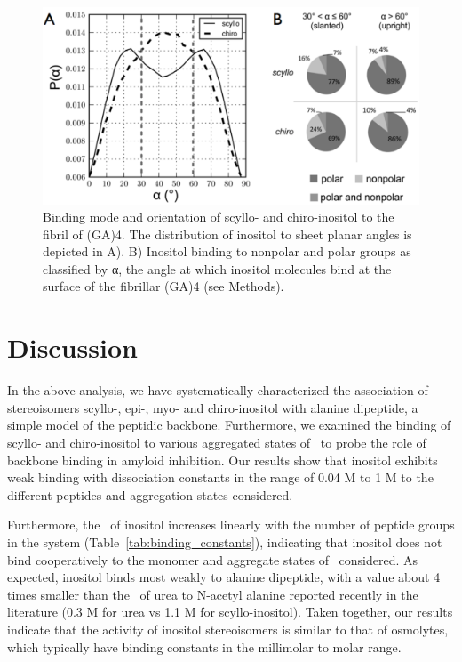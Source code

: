 \begin{figure}[htbp]
  \centering
  \includegraphics[width=6in]{figures/results1/GA4_paper_figures_submitted-8-rearranged}
  \caption[Binding mode and orientation of scyllo- and chiro-inositol to the fibril of \gafour.]{Binding mode and orientation of scyllo- and chiro-inositol to the fibril of (GA)4. The distribution of inositol to sheet planar angles is depicted in A). B) Inositol binding to nonpolar and polar groups as classified by α, the angle at which inositol molecules bind at the surface of the fibrillar (GA)4 (see Methods).}
   \label{fig:figure8}
\end{figure}

\section{Discussion}
In the above analysis, we have systematically characterized the association of stereoisomers scyllo-, epi-, myo- and chiro-inositol with alanine dipeptide, a simple model of the peptidic backbone. Furthermore, we examined the binding of scyllo- and chiro-inositol to various aggregated states of \gafour\ to probe the role of backbone binding in amyloid inhibition. Our results show that inositol exhibits weak binding with dissociation constants in the range of 0.04 M to 1 M to the different peptides and aggregation states considered.

Furthermore, the \KD\ of inositol increases linearly with the number of peptide groups in the system (Table~\ref{tab:binding_constants}), indicating that inositol does not bind cooperatively to the monomer and aggregate states of \gafour\ considered. As expected, inositol binds most weakly to alanine dipeptide, with a value about 4 times smaller than the \KD\ of urea to N-acetyl alanine reported recently in the literature (0.3 M for urea\cite{Lee:2010p59} vs 1.1 M for scyllo-inositol). Taken together, our results indicate that the activity of inositol stereoisomers is similar to that of osmolytes, which typically have binding constants in the millimolar to molar range.\cite{Rosgen:2007p90,Street:2006p21}

